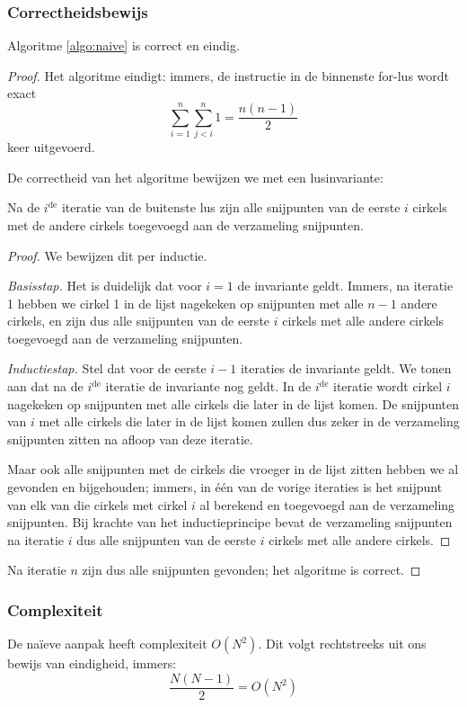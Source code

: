 \subsubsection{Correctheidsbewijs}
\begin{stl} Algoritme \ref{algo:naive} is correct en eindig.\end{stl}
\begin{proof}
Het algoritme eindigt: immers, de instructie in de binnenste for-lus
wordt exact \[\sum_{i=1}^{n} \sum_{j<i}^{n} 1 = \frac{n(n-1)}{2} \]
keer uitgevoerd. 

De correctheid van het algoritme bewijzen we met een lusinvariante:
\begin{inv} 
Na de $i^{\textrm{de}}$ iteratie van de buitenste lus zijn
alle snijpunten van de eerste $i$ cirkels met de andere cirkels
toegevoegd aan de verzameling snijpunten.
\end{inv} 

\begin{proof}
We bewijzen dit per inductie.

\textit{Basisstap.} Het is duidelijk dat voor $i = 1$ de invariante
geldt. Immers, na iteratie 1 hebben we cirkel 1 in de lijst nagekeken
op snijpunten met alle $n-1$ andere cirkels, en zijn dus alle
snijpunten van de eerste $i$ cirkels met alle andere cirkels
toegevoegd aan de verzameling snijpunten.

\textit{Inductiestap.} Stel dat voor de eerste $i - 1$ iteraties de
invariante geldt. We tonen aan dat na de $i^{\textrm{de}}$
iteratie de invariante nog geldt. In de $i^{\textrm{de}}$ iteratie
wordt cirkel $i$ nagekeken op snijpunten met alle cirkels die later in
de lijst komen. De snijpunten van $i$ met alle cirkels die later in de
lijst komen zullen dus zeker in de verzameling snijpunten zitten na
afloop van deze iteratie. 

Maar ook alle snijpunten met de cirkels die vroeger in de lijst zitten
hebben we al gevonden en bijgehouden; immers, in \'e\'en van de vorige
iteraties is het snijpunt van elk van die cirkels met cirkel $i$ al
berekend en toegevoegd aan de verzameling snijpunten. Bij krachte van
het inductieprincipe bevat de verzameling snijpunten na iteratie $i$
dus alle snijpunten van de eerste $i$ cirkels met alle andere
cirkels. 
\end{proof}

Na iteratie $n$ zijn dus alle snijpunten gevonden; het algoritme is correct.
\end{proof}

\subsubsection{Complexiteit}
De na\"ieve aanpak heeft complexiteit $O(N^2)$. Dit volgt rechtstreeks
uit ons bewijs van eindigheid, immers:
\[\frac{N(N-1)}{2} = O(N^2) \]


